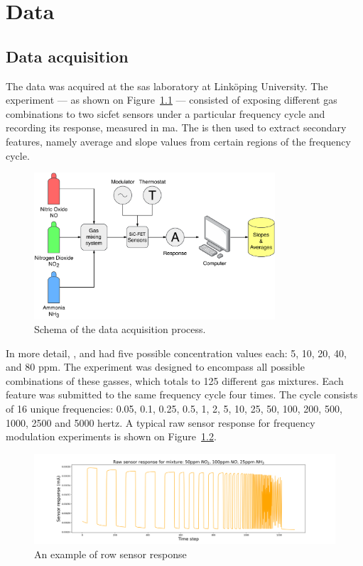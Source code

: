 \chapter{Data}
\label{cha:data}

\section{Data acquisition}
\label{sec:data-acquisition}

The data was acquired at the \acrfull{sas} laboratory at Linköping University. The experiment --- as shown on Figure~\ref{fig:experimental-setup} --- consisted of exposing different gas combinations to two \acrshort{sicfet} sensors under a particular frequency cycle and recording its response, measured in \acrfull{ma}. The is then used to extract secondary features, namely average and slope values from certain regions of the frequency cycle.

\begin{figure}[!htb]
	\centering
	\includegraphics[width=0.8\textwidth]{../figures/experimental-setup.pdf}
	\caption{Schema of the data acquisition process.}
	\label{fig:experimental-setup}
\end{figure}

In more detail, ,  and  had five possible concentration values each: 5, 10, 20, 40, and 80 \acrfull{ppm}. The experiment was designed to encompass all possible combinations of these gasses, which totals to 125 different gas mixtures. Each feature was submitted to the same frequency cycle four times. The cycle consists of 16 unique frequencies: 0.05, 0.1, 0.25, 0.5, 1, 2, 5, 10, 25, 50, 100, 200, 500, 1000, 2500 and 5000 \acrfull{hertz}. A typical raw sensor response for frequency modulation experiments is shown on Figure~\ref{fig:raw}.

\begin{figure}[!htb]
	\centering
	\includegraphics[width=1\textwidth]{../figures/raw-response.png}
	\caption{An example of row sensor response}
	\label{fig:raw}
\end{figure}



